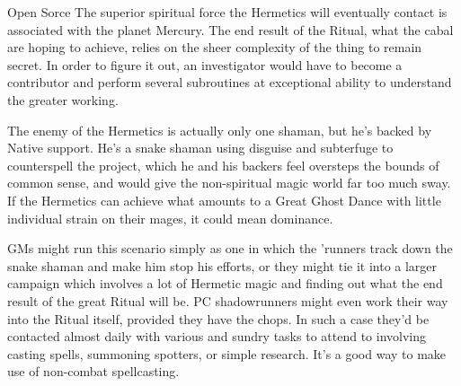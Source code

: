 \begin{scenario}{Open Sorce}
The superior spiritual force the Hermetics will eventually contact is associated with the planet Mercury. The end result of the Ritual, what the cabal are hoping to achieve, relies on the sheer complexity of the thing to remain secret. In order to figure it out, an investigator would have to become a contributor and perform several subroutines at exceptional ability to understand the greater working.

The enemy of the Hermetics is actually only one shaman, but he's backed by Native support. He's a snake shaman using disguise and subterfuge to counterspell the project, which he and his backers feel oversteps the bounds of common sense, and would give the non-spiritual magic world far too much sway. If the Hermetics can achieve what amounts to a Great Ghost Dance with little individual strain on their mages, it could mean dominance.

GMs might run this scenario simply as one in which the 'runners track down the snake shaman and make him stop his efforts, or they might tie it into a larger campaign which involves a lot of Hermetic magic and finding out what the end result of the great Ritual will be. PC shadowrunners might even work their way into the Ritual itself, provided they have the chops. In such a case they'd be contacted almost daily with various and sundry tasks to attend to involving casting spells, summoning spotters, or simple research. It's a good way to make use of non-combat spellcasting. 

\end{scenario}